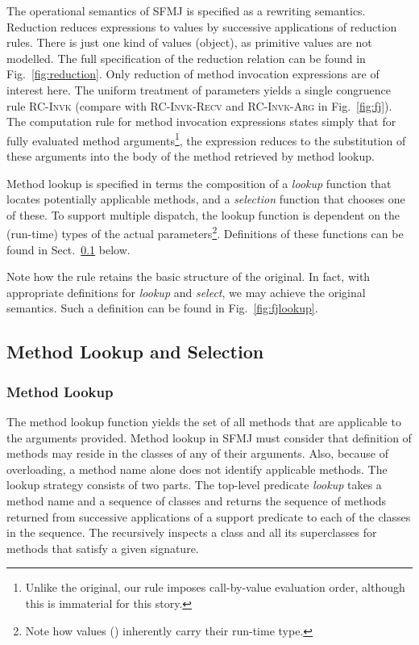 \documentclass[11pt]{article}
\begin{document}
The operational semantics of SFMJ is specified as a rewriting semantics. Reduction reduces expressions to values by successive applications of reduction rules. There is just one kind of values (object), as primitive values are not modelled. The full specification of the reduction relation can be found in Fig.~\ref{fig:reduction}. Only reduction of method invocation expressions are of interest here. The uniform treatment of parameters yields a single congruence rule \textsc{RC-Invk} (compare with \textsc{RC-Invk-Recv} and \textsc{RC-Invk-Arg} in Fig.~\ref{fig:fj}). The computation rule for method invocation expressions states simply that for fully evaluated method arguments\footnote{Unlike the original, our rule imposes call-by-value evaluation order, although this is immaterial for this story.}, the expression reduces to the substitution of these arguments into the body of the method retrieved by method lookup. 

Method lookup is specified in terms  the composition of a \emph{lookup} function that locates potentially applicable methods, and a \emph{selection} function that chooses one of these. To support multiple dispatch, the lookup function is dependent on the (run-time) types of the actual parameters\footnote{Note how values () inherently carry their run-time type.}. Definitions of these functions can be found in Sect.~\ref{sec:lookup} below.

 {}


Note how the rule retains the basic structure of the original. In fact, with appropriate definitions for \emph{lookup} and \emph{select}, we may achieve the original semantics. Such a definition can be found in Fig.~\ref{fig:fjlookup}.



\subsection{Method Lookup and Selection}
\label{sec:lookup}

\subsubsection*{Method Lookup}

The method lookup function yields the set of all methods that are applicable to the arguments provided. Method lookup in SFMJ must consider that definition of methods may reside in the classes of any of their arguments. Also, because of overloading, a method name alone does not identify applicable methods. The lookup strategy consists of two parts. The top-level predicate \textit{lookup} takes a method name and a sequence of classes and returns the sequence of methods returned from successive applications of a support predicate  to each of the classes in the sequence. The  recursively inspects a class and all its superclasses for methods that satisfy a given signature.
\end{document}
